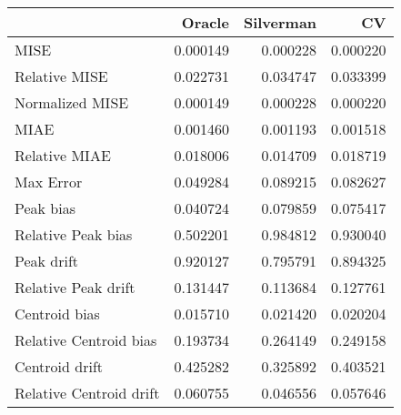 \begin{tabular}{lrrr}
  \hline
 & Oracle & Silverman & CV \\ 
  \hline
MISE & 0.000149 & 0.000228 & 0.000220 \\ 
  Relative MISE & 0.022731 & 0.034747 & 0.033399 \\ 
  Normalized MISE & 0.000149 & 0.000228 & 0.000220 \\ 
  MIAE & 0.001460 & 0.001193 & 0.001518 \\ 
  Relative MIAE & 0.018006 & 0.014709 & 0.018719 \\ 
  Max Error & 0.049284 & 0.089215 & 0.082627 \\ 
  Peak bias & 0.040724 & 0.079859 & 0.075417 \\ 
  Relative Peak bias & 0.502201 & 0.984812 & 0.930040 \\ 
  Peak drift & 0.920127 & 0.795791 & 0.894325 \\ 
  Relative Peak drift & 0.131447 & 0.113684 & 0.127761 \\ 
  Centroid bias & 0.015710 & 0.021420 & 0.020204 \\ 
  Relative Centroid bias & 0.193734 & 0.264149 & 0.249158 \\ 
  Centroid drift & 0.425282 & 0.325892 & 0.403521 \\ 
  Relative Centroid drift & 0.060755 & 0.046556 & 0.057646 \\ 
   \hline
\end{tabular}
